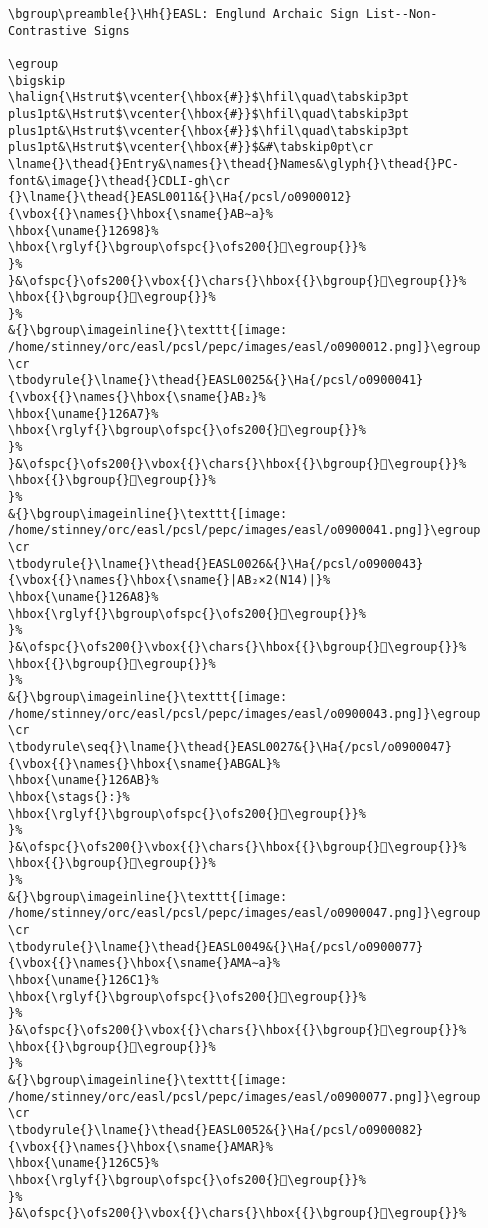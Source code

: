 \begin{verbatim}
\bgroup\preamble{}\Hh{}EASL: Englund Archaic Sign List--Non-Contrastive Signs

\egroup
\bigskip
\halign{\Hstrut$\vcenter{\hbox{#}}$\hfil\quad\tabskip3pt plus1pt&\Hstrut$\vcenter{\hbox{#}}$\hfil\quad\tabskip3pt plus1pt&\Hstrut$\vcenter{\hbox{#}}$\hfil\quad\tabskip3pt plus1pt&\Hstrut$\vcenter{\hbox{#}}$&#\tabskip0pt\cr
\lname{}\thead{}Entry&\names{}\thead{}Names&\glyph{}\thead{}PC-font&\image{}\thead{}CDLI-gh\cr
{}\lname{}\thead{}EASL0011&{}\Ha{/pcsl/o0900012}{\vbox{{}\names{}\hbox{\sname{}AB∼a}%
\hbox{\uname{}12698}%
\hbox{\rglyf{}\bgroup\ofspc{}\ofs200{}𒚘\egroup{}}%
}%
}&\ofspc{}\ofs200{}\vbox{{}\chars{}\hbox{{}\bgroup{}𒚢\egroup{}}%
\hbox{{}\bgroup{}𒚘\egroup{}}%
}%
&{}\bgroup\imageinline{}\texttt{[image: /home/stinney/orc/easl/pcsl/pepc/images/easl/o0900012.png]}\egroup
\cr
\tbodyrule{}\lname{}\thead{}EASL0025&{}\Ha{/pcsl/o0900041}{\vbox{{}\names{}\hbox{\sname{}AB₂}%
\hbox{\uname{}126A7}%
\hbox{\rglyf{}\bgroup\ofspc{}\ofs200{}𒚧\egroup{}}%
}%
}&\ofspc{}\ofs200{}\vbox{{}\chars{}\hbox{{}\bgroup{}𒚧\egroup{}}%
\hbox{{}\bgroup{}𒚩\egroup{}}%
}%
&{}\bgroup\imageinline{}\texttt{[image: /home/stinney/orc/easl/pcsl/pepc/images/easl/o0900041.png]}\egroup
\cr
\tbodyrule{}\lname{}\thead{}EASL0026&{}\Ha{/pcsl/o0900043}{\vbox{{}\names{}\hbox{\sname{}|AB₂×2(N14)|}%
\hbox{\uname{}126A8}%
\hbox{\rglyf{}\bgroup\ofspc{}\ofs200{}𒚨\egroup{}}%
}%
}&\ofspc{}\ofs200{}\vbox{{}\chars{}\hbox{{}\bgroup{}𒚪\egroup{}}%
\hbox{{}\bgroup{}𒚨\egroup{}}%
}%
&{}\bgroup\imageinline{}\texttt{[image: /home/stinney/orc/easl/pcsl/pepc/images/easl/o0900043.png]}\egroup
\cr
\tbodyrule\seq{}\lname{}\thead{}EASL0027&{}\Ha{/pcsl/o0900047}{\vbox{{}\names{}\hbox{\sname{}ABGAL}%
\hbox{\uname{}126AB}%
\hbox{\stags{}:}%
\hbox{\rglyf{}\bgroup\ofspc{}\ofs200{}𒚫\egroup{}}%
}%
}&\ofspc{}\ofs200{}\vbox{{}\chars{}\hbox{{}\bgroup{}𒚫\egroup{}}%
\hbox{{}\bgroup{}𒚬\egroup{}}%
}%
&{}\bgroup\imageinline{}\texttt{[image: /home/stinney/orc/easl/pcsl/pepc/images/easl/o0900047.png]}\egroup
\cr
\tbodyrule{}\lname{}\thead{}EASL0049&{}\Ha{/pcsl/o0900077}{\vbox{{}\names{}\hbox{\sname{}AMA∼a}%
\hbox{\uname{}126C1}%
\hbox{\rglyf{}\bgroup\ofspc{}\ofs200{}𒛁\egroup{}}%
}%
}&\ofspc{}\ofs200{}\vbox{{}\chars{}\hbox{{}\bgroup{}𒛁\egroup{}}%
\hbox{{}\bgroup{}𒛃\egroup{}}%
}%
&{}\bgroup\imageinline{}\texttt{[image: /home/stinney/orc/easl/pcsl/pepc/images/easl/o0900077.png]}\egroup
\cr
\tbodyrule{}\lname{}\thead{}EASL0052&{}\Ha{/pcsl/o0900082}{\vbox{{}\names{}\hbox{\sname{}AMAR}%
\hbox{\uname{}126C5}%
\hbox{\rglyf{}\bgroup\ofspc{}\ofs200{}𒛅\egroup{}}%
}%
}&\ofspc{}\ofs200{}\vbox{{}\chars{}\hbox{{}\bgroup{}𒛊\egroup{}}%

\end{verbatim}
